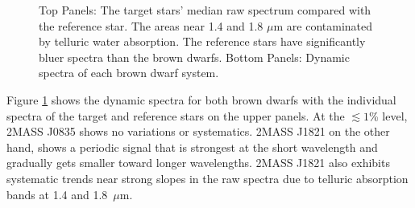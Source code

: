 \documentclass[twocolumn]{aastex6}
\begin{document}
\begin{figure}[!t]
\centering
{}
	\caption{Top Panels: The target stars' median raw spectrum compared with the reference star. The areas near 1.4 and 1.8 $\mu$m are contaminated by telluric water absorption. The reference stars have significantly bluer spectra than the brown dwarfs. Bottom Panels: Dynamic spectra of each brown dwarf system.}
	\label{fig:specphot}
	\vspace{0.1in}
\end{figure} 

Figure \ref{fig:specphot} shows the dynamic spectra for both brown dwarfs with the individual spectra of the target and reference stars on the upper panels.
At the $\lesssim 1$\% level, 2MASS J0835 shows no variations or systematics.
2MASS J1821 on the other hand, shows a periodic signal that is strongest at the short wavelength and gradually gets smaller toward longer wavelengths.
2MASS J1821 also exhibits systematic trends near strong slopes in the raw spectra due to telluric absorption bands at 1.4 and 1.8~$\mu$m.
\end{document}
